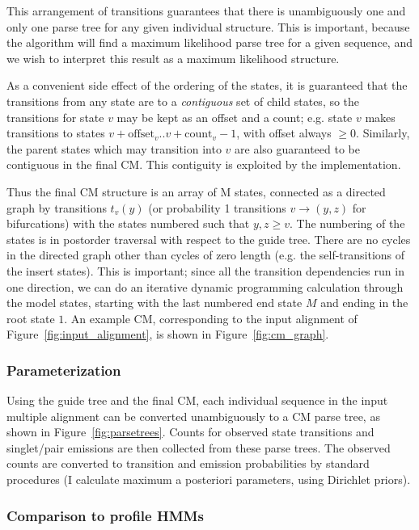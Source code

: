\documentclass[11pt]{article}
\begin{document}
This arrangement of transitions guarantees that there is unambiguously
one and only one parse tree for any given individual structure. This
is important, because the algorithm will find a maximum likelihood
parse tree for a given sequence, and we wish to interpret this result
as a maximum likelihood structure.

As a convenient side effect of the ordering of the states, it is
guaranteed that the transitions from any state are to a
\emph{contiguous} set of child states, so the transitions for state
$v$ may be kept as an offset and a count; e.g. state $v$ makes
transitions to states $v+\mbox{offset}_v..v+\mbox{count}_v-1$, with offset
always $\geq 0$.  Similarly, the parent states which may transition
into $v$ are also guaranteed to be contiguous in the final CM. This
contiguity is exploited by the implementation.

Thus the final CM structure is an array of M states, connected as a
directed graph by transitions $t_v(y)$ (or probability 1 transitions
$v \rightarrow (y,z)$ for bifurcations) with the states numbered such
that $y,z \geq v$. The numbering of the states is in postorder
traversal with respect to the guide tree. There are no cycles in the
directed graph other than cycles of zero length (e.g. the
self-transitions of the insert states). This is important; since all
the transition dependencies run in one direction, we can do an
iterative dynamic programming calculation through the model states,
starting with the last numbered end state $M$ and ending in the root
state $1$.  An example CM, corresponding to the input alignment of
Figure~\ref{fig:input_alignment}, is shown in
Figure~\ref{fig:cm_graph}.

\subsubsection{Parameterization}

Using the guide tree and the final CM, each individual sequence in the
input multiple alignment can be converted unambiguously to a CM parse
tree, as shown in Figure~\ref{fig:parsetrees}. Counts for observed
state transitions and singlet/pair emissions are then collected from
these parse trees. The observed counts are converted to transition and
emission probabilities by standard procedures (I calculate maximum a
posteriori parameters, using Dirichlet priors). 

\subsubsection{Comparison to profile HMMs}
\end{document}
